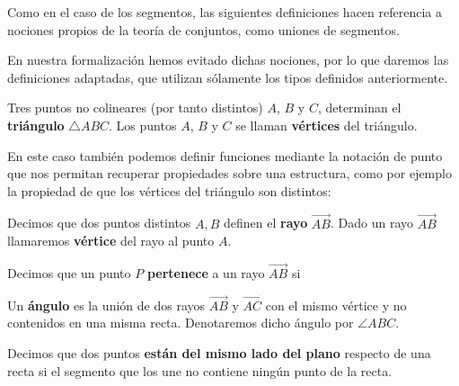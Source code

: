 Como en el caso de los segmentos, las siguientes definiciones hacen referencia
a nociones propios de la teoría de conjuntos, como uniones de segmentos.

En nuestra formalización hemos evitado dichas nociones, por lo que daremos las
definiciones adaptadas, que utilizan sólamente los tipos definidos
anteriormente.

\begin{defin*}[Triángulos]
	Tres puntos no colineares (por tanto distintos) $A$, $B$ y $C$, determinan
	el \textbf{triángulo} $\triangle ABC$. Los puntos $A$, $B$ y $C$ se llaman
	\textbf{vértices} del triángulo.
\end{defin*}


En este caso también podemos definir funciones mediante la notación de punto que
nos permitan recuperar propiedades sobre una estructura, como por ejemplo la
propiedad de que los vértices del triángulo son distintos:


\begin{defin*}

	Decimos que dos puntos distintos $A, B$ definen el \textbf{rayo}
	$\overrightarrow{AB}$. Dado un rayo $\overrightarrow{AB}$ llamaremos
	\textbf{vértice} del rayo al punto $A$.

	Decimos que un punto $P$ \textbf{pertenece} a un rayo $\overrightarrow{AB}$
	si

\end{defin*}


\begin{defin*}[Ángulos]
	Un \textbf{ángulo} es la unión de dos rayos $\overrightarrow{AB}$ y
	$\overrightarrow{AC}$ con el mismo vértice y no contenidos en una misma recta.
	Denotaremos dicho ángulo por $\angle ABC$.
\end{defin*}


\begin{defin*}
	Decimos que dos puntos \textbf{están del mismo lado del plano} respecto de una
	recta si el segmento que los une no contiene ningún punto de la recta.
\end{defin*}

